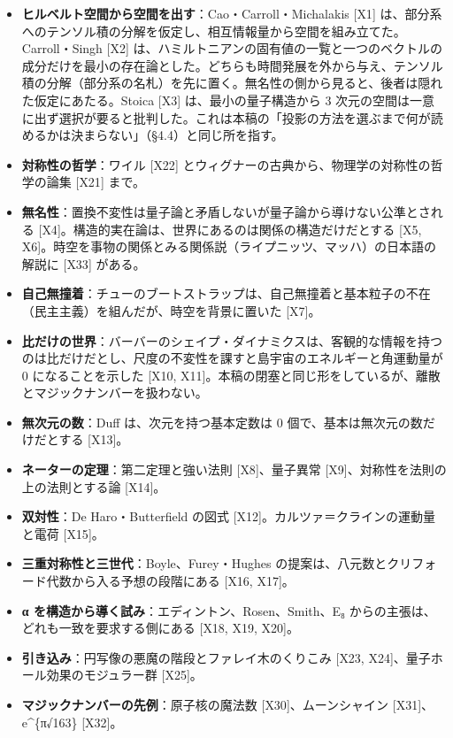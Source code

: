 \documentclass[
  a4paper,
]{ltjsarticle}
\providecommand{\tightlist}{%
  \setlength{\itemsep}{0pt}\setlength{\parskip}{0pt}}
\begin{document}
\begin{itemize}
\tightlist
\item
  \textbf{ヒルベルト空間から空間を出す}：Cao・Carroll・Michalakis
  {[}X1{]}
  は、部分系へのテンソル積の分解を仮定し、相互情報量から空間を組み立てた。Carroll・Singh
  {[}X2{]}
  は、ハミルトニアンの固有値の一覧と一つのベクトルの成分だけを最小の存在論とした。どちらも時間発展を外から与え、テンソル積の分解（部分系の名札）を先に置く。無名性の側から見ると、後者は隠れた仮定にあたる。Stoica
  {[}X3{]} は、最小の量子構造から 3
  次元の空間は一意に出ず選択が要ると批判した。これは本稿の「投影の方法を選ぶまで何が読めるかは決まらない」（§4.4）と同じ所を指す。
\item
  \textbf{対称性の哲学}：ワイル {[}X22{]}
  とウィグナーの古典から、物理学の対称性の哲学の論集 {[}X21{]} まで。
\item
  \textbf{無名性}：置換不変性は量子論と矛盾しないが量子論から導けない公準とされる
  {[}X4{]}。構造的実在論は、世界にあるのは関係の構造だけだとする {[}X5,
  X6{]}。時空を事物の関係とみる関係説（ライプニッツ、マッハ）の日本語の解説に
  {[}X33{]} がある。
\item
  \textbf{自己無撞着}：チューのブートストラップは、自己無撞着と基本粒子の不在（民主主義）を組んだが、時空を背景に置いた
  {[}X7{]}。
\item
  \textbf{比だけの世界}：バーバーのシェイプ・ダイナミクスは、客観的な情報を持つのは比だけだとし、尺度の不変性を課すと島宇宙のエネルギーと角運動量が
  0 になることを示した {[}X10,
  X11{]}。本稿の閉塞と同じ形をしているが、離散とマジックナンバーを扱わない。
\item
  \textbf{無次元の数}：Duff は、次元を持つ基本定数は 0
  個で、基本は無次元の数だけだとする {[}X13{]}。
\item
  \textbf{ネーターの定理}：第二定理と強い法則 {[}X8{]}、量子異常
  {[}X9{]}、対称性を法則の上の法則とする論 {[}X14{]}。
\item
  \textbf{双対性}：De Haro・Butterfield の図式
  {[}X12{]}。カルツァ＝クラインの運動量と電荷 {[}X15{]}。
\item
  \textbf{三重対称性と三世代}：Boyle、Furey・Hughes
  の提案は、八元数とクリフォード代数から入る予想の段階にある {[}X16,
  X17{]}。
\item
  \textbf{α を構造から導く試み}：エディントン、Rosen、Smith、E₈
  からの主張は、どれも一致を要求する側にある {[}X18, X19, X20{]}。
\item
  \textbf{引き込み}：円写像の悪魔の階段とファレイ木のくりこみ {[}X23,
  X24{]}、量子ホール効果のモジュラー群 {[}X25{]}。
\item
  \textbf{マジックナンバーの先例}：原子核の魔法数
  {[}X30{]}、ムーンシャイン {[}X31{]}、e\^{}\{π√163\} {[}X32{]}。
\end{itemize}
\end{document}
